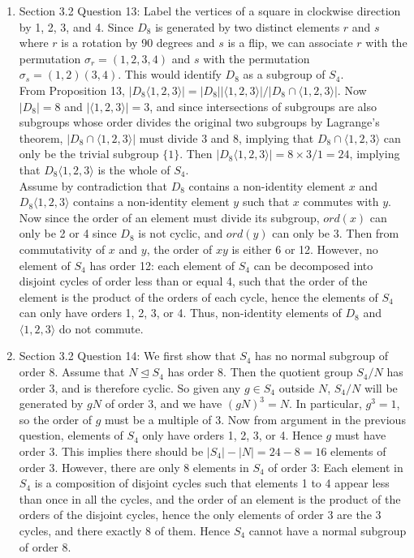 \documentclass{article}
\begin{document}
\begin{enumerate}
  \item Section 3.2 Question 13: Label the vertices of a square in
    clockwise direction by 1, 2, 3, and 4. Since $D_8$ is generated by two
    distinct elements $r$ and $s$ where $r$ is a rotation by 90 degrees and
    $s$ is a flip, we can associate $r$ with the permutation
    $\sigma_r=(1,2,3,4)$ and $s$ with the permutation
    $\sigma_s=(1,2)(3,4)$. This would identify $D_8$ as a subgroup of
    $S_4$. \\

    From Proposition 13, $|D_8\langle 1,2,3\rangle|=|D_8||\langle
    1,2,3\rangle|/|D_8\cap\langle 1,2,3\rangle|$. Now $|D_8|=8$ and
    $|\langle 1,2,3\rangle|=3$, and since intersections of subgroups are
    also subgroups whose order divides the original two subgroups by
    Lagrange's theorem, $|D_8\cap\langle 1,2,3\rangle|$ must divide 3 and
    8, implying that $D_8\cap\langle 1,2,3\rangle$ can only be the trivial
    subgroup $\{1\}$. Then $|D_8\langle 1,2,3\rangle|=8\times 3/1=24$,
    implying that $D_8\langle 1,2,3\rangle$ is the whole of $S_4$. \\

    Assume by contradiction that $D_8$ contains a non-identity element $x$
    and $D_8\langle 1,2,3\rangle$ contains a non-identity element $y$ such
    that $x$ commutes with $y$. Now since the order of an element must
    divide its subgroup, $ord(x)$ can only be 2 or 4 since $D_8$ is not
    cyclic, and $ord(y)$ can only be 3. Then from commutativity of $x$ and
    $y$, the order of $xy$ is either 6 or 12. However, no element of $S_4$
    has order 12: each element of $S_4$ can be decomposed into disjoint
    cycles of order less than or equal 4, such that the order of the
    element is the product of the orders of each cycle, hence the elements
    of $S_4$ can only have orders 1, 2, 3, or 4. Thus, non-identity
    elements of $D_8$ and $\langle 1,2,3\rangle$ do not commute.

  \item Section 3.2 Question 14: We first show that $S_4$ has no normal
    subgroup of order 8. Assume that $N\trianglelefteq S_4$ has order 8.
    Then the quotient group $S_4/N$ has order 3, and is therefore cyclic.
    So given any $g\in S_4$ outside $N$, $S_4/N$ will be generated by $gN$
    of order 3, and we have $(gN)^3=N$. In particular, $g^3=1$, so the
    order of $g$ must be a multiple of 3. Now from argument in the previous
    question, elements of $S_4$ only have orders 1, 2, 3, or 4. Hence $g$
    must have order 3. This implies there should be $|S_4|-|N|=24-8=16$
    elements of order 3. However, there are only 8 elements in $S_4$ of
    order 3: Each element in $S_4$ is a composition of disjoint cycles such
    that elements 1 to 4 appear less than once in all the cycles, and the
    order of an element is the product of the orders of the disjoint
    cycles, hence the only elements of order 3 are the 3 cycles, and there
    exactly 8 of them. Hence $S_4$ cannot have a normal subgroup of order
    8. \\


\end{enumerate}
\end{document}
